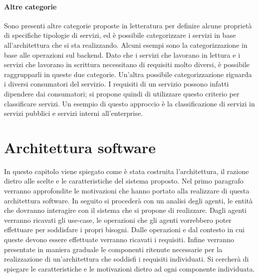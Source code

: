 \documentclass[12pt]{report}
\begin{document}
\subsubsection{Altre categorie}
Sono presenti altre categorie proposte in letteratura per definire alcune proprietà di specifiche tipologie di servizi, ed è possibile categorizzare i servizi in base all'architettura che si sta realizzando. 
Alcuni esempi sono la categorizzazione in base alle operazioni sul backend. 
Dato che i servizi che lavorano in lettura e i servizi che lavorano in scrittura necessitano di requisiti molto diversi, è possibile raggrupparli in queste due categorie.
Un'altra possibile categorizzazione riguarda i diversi consumatori del servizio. 
I requisiti di un servizio possono infatti dipendere dai consumatori; si propone quindi di utilizzare questo criterio per classificare servizi. 
Un esempio di questo approccio è la classificazione di servizi in servizi pubblici e  servizi interni all'enterprise.

\chapter{Architettura software}\label{architetturaLogica}
In questo capitolo viene spiegato come è stata costruita l'architettura, il razione dietro alle scelte e le caratteristiche del sistema proposto. 
Nel primo paragrafo verranno approfondite le motivazioni che hanno portato alla realizzare di questa architettura software.
In seguito si procederà con un analisi degli agenti, le entità che dovranno interagire con il sistema che si propone di realizzare.
Dagli agenti verranno ricavati gli use-case, le operazioni che gli agenti vorrebbero poter effettuare per soddisfare i propri bisogni.
Dalle operazioni e dal contesto in cui queste devono essere effettuate verranno ricavati i requisiti.
Infine verranno presentate in maniera graduale le componenti ritenute necessarie per la realizzazione di un'architettura che soddisfi i requisiti individuati. 
Si cercherà di spiegare le caratteristiche e le motivazioni dietro ad ogni componente individuata.
\end{document}
